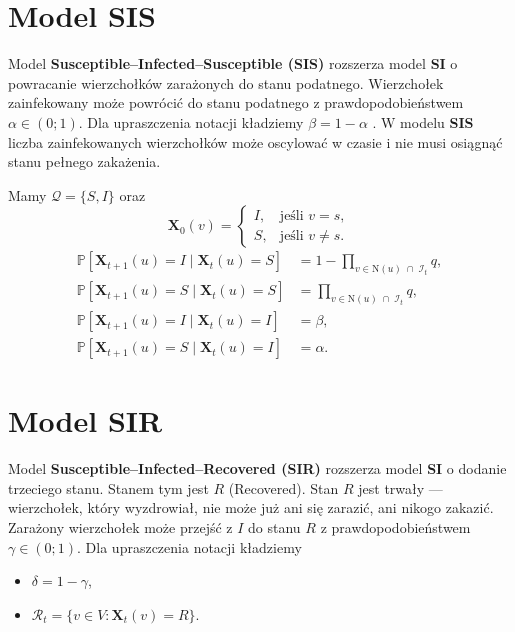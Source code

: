 \section{Model SIS}

Model \textbf{Susceptible--Infected--Susceptible (SIS)} rozszerza model \textbf{SI} o powracanie wierzchołków zarażonych do stanu podatnego. Wierzchołek zainfekowany może powrócić do stanu podatnego z prawdopodobieństwem $\alpha \in (0;1)$. Dla upraszczenia notacji kładziemy $\beta=1-\alpha $ .
W modelu \textbf{SIS} liczba zainfekowanych wierzchołków może oscylować w czasie i nie musi osiągnąć stanu pełnego zakażenia.

Mamy $\mathcal{Q} = \{S, I\}$ oraz
\[
\mathbf{X}_0(v) =
\begin{cases}
I, & \text{jeśli } v = s, \\[4pt]
S, & \text{jeśli } v \neq s.
\end{cases}
\]
\[
\begin{aligned}
\mathbb{P}[\mathbf{X}_{t+1}(u) = I \mid \mathbf{X}_t(u) = S]
 &= 1 - \prod_{v \in \mathrm{N}(u) \;\cap\; \mathcal{I}_t} q, \\[6pt]
\mathbb{P}[\mathbf{X}_{t+1}(u) = S \mid \mathbf{X}_t(u) = S]
 &= \prod_{v \in \mathrm{N}(u) \;\cap\; \mathcal{I}_t} q, \\[6pt]
\mathbb{P}[\mathbf{X}_{t+1}(u) = I \mid \mathbf{X}_t(u) = I]
 &= \beta, \\[6pt]
\mathbb{P}[\mathbf{X}_{t+1}(u) = S \mid \mathbf{X}_t(u) = I]
 &= \alpha.
\end{aligned}
\]


\section{Model SIR}

Model \textbf{Susceptible--Infected--Recovered (SIR)} rozszerza model \textbf{SI} o dodanie trzeciego stanu. Stanem tym jest $R$ (Recovered). 
Stan $R$ jest trwały — wierzchołek, który wyzdrowiał, nie może już ani się zarazić, ani nikogo zakazić. Zarażony wierzchołek może przejść z $I$ do stanu $R$ z prawdopodobieństwem $\gamma \in (0;1)$. Dla upraszczenia notacji kładziemy 
\begin{itemize}
    \item $\delta=1-\gamma$,
    \item $\mathcal{R}_t=\{v\in V: \mathbf{X}_t(v) = R\}$.
\end{itemize}
   
